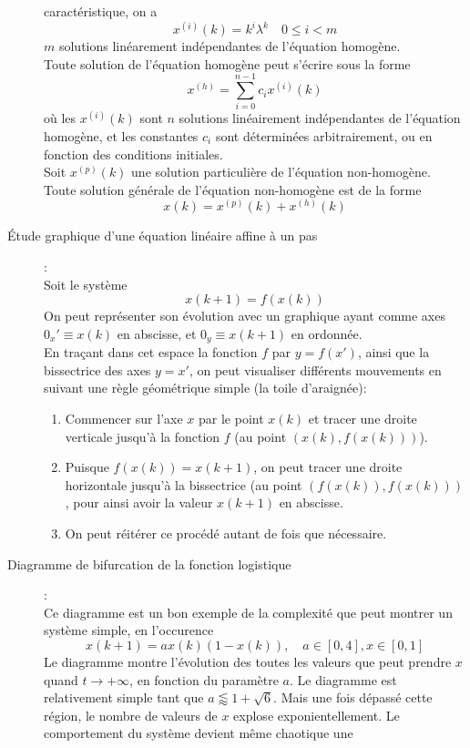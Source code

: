 \documentclass[a4paper]{article}
\begin{document}
\begin{description}
		caractéristique, on a
		\[x^{(i)}(k)=k^i\lambda^k\quad 0\le i<m\]
		\(m\) solutions linéarement indépendantes de l'équation homogène.\\
		Toute solution de l'équation homogène peut s'écrire sous la forme
		\[x^{(h)}=\sum_{i=0}^{n-1}c_ix^{(i)}(k)\]
		où les \(x^{(i)}(k)\) sont \(n\) solutions linéairement indépendantes de
		l'équation homogène, et les constantes \(c_i\) sont déterminées
		arbitrairement, ou en fonction des conditions initiales. \\
		Soit \(x^{(p)}(k)\) une solution particulière de l'équation non-homogène.
		Toute solution générale de l'équation non-homogène est de la forme
		\[x(k)=x^{(p)}(k)+x^{(h)}(k)\]
	\item [Étude graphique d'une équation linéaire affine à un pas]:\\
		Soit le système
		\[x(k+1)=f(x(k))\]
		On peut représenter son évolution avec un graphique ayant comme axes
		\(0_x'\equiv x(k)\) en abscisse, et \(0_y\equiv x(k+1)\) en ordonnée.\\
		En traçant dans cet espace la fonction \(f\) par \(y=f(x')\), ainsi que la
		bissectrice des axes \(y=x'\), on peut visualiser différents mouvements
		en suivant une règle géométrique simple (la toile d'araignée):
		\begin{enumerate}
			\item Commencer sur l'axe \(x\) par le point \(x(k)\) et tracer une droite
				verticale jusqu'à la fonction \(f\) (au point \((x(k),f(x(k)))\)).
			\item Puisque \(f(x(k))=x(k+1)\), on peut tracer une droite horizontale
				jusqu'à la bissectrice (au point \((f(x(k)),f(x(k)))\), pour ainsi
				avoir la valeur \(x(k+1)\) en abscisse.
			\item On peut réitérer ce procédé autant de fois que nécessaire.
		\end{enumerate}
	\item [Diagramme de bifurcation de la fonction logistique]:\\
		Ce diagramme est un bon exemple de la complexité que peut montrer un
		système simple, en l'occurence
		\[x(k+1)=ax(k)(1-x(k)),\quad a\in[0,4],x\in[0,1]\]
		Le diagramme montre l'évolution des toutes les valeurs que peut prendre
		\(x\) quand \(t\to + \infty \), en fonction du paramètre \(a\).
		Le diagramme est relativement simple tant que \(a\lessapprox 1+\sqrt{6}\).
		Mais une fois dépassé cette région, le nombre de valeurs de \(x\) explose
		exponientellement. Le comportement du système devient même chaotique une

\end{description}
\end{document}
